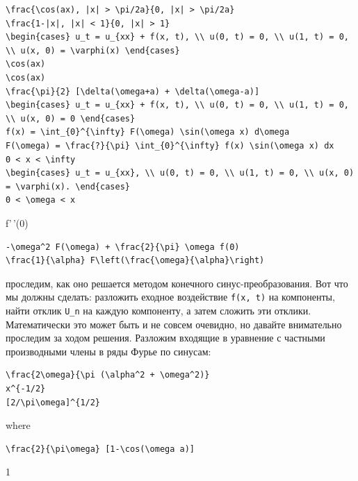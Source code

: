 \documentclass[
  ukrainian,
]{article}
\begin{document}
\begin{verbatim}
\frac{\cos(ax), |x| > \pi/2a}{0, |x| > \pi/2a}
\frac{1-|x|, |x| < 1}{0, |x| > 1}
\begin{cases} u_t = u_{xx} + f(x, t), \\ u(0, t) = 0, \\ u(1, t) = 0, \\ u(x, 0) = \varphi(x) \end{cases}
\cos(ax)
\cos(ax)
\frac{\pi}{2} [\delta(\omega+a) + \delta(\omega-a)]
\begin{cases} u_t = u_{xx} + f(x, t), \\ u(0, t) = 0, \\ u(1, t) = 0, \\ u(x, 0) = 0 \end{cases}
f(x) = \int_{0}^{\infty} F(\omega) \sin(\omega x) d\omega
F(\omega) = \frac{?}{\pi} \int_{0}^{\infty} f(x) \sin(\omega x) dx
0 < x < \infty
\begin{cases} u_t = u_{xx}, \\ u(0, t) = 0, \\ u(1, t) = 0, \\ u(x, 0) = \varphi(x). \end{cases}
0 < \omega < x
\end{verbatim}

f'\,'(0)

\begin{verbatim}
-\omega^2 F(\omega) + \frac{2}{\pi} \omega f(0)
\frac{1}{\alpha} F\left(\frac{\omega}{\alpha}\right)
\end{verbatim}

проследим, как оно решается методом конечного синус-преобразования. Вот
что мы должны сделать: разложить еходное воздействие \texttt{f(x,\ t)}
на компоненты, найти отклик \texttt{U\_n} на каждую компоненту, а затем
сложить эти отклики. Математически это может быть и не совсем очевидно,
но давайте внимательно проследим за ходом решения. Разложим входящие в
уравнение с частными производными члены в ряды Фурье по синусам:

\begin{verbatim}
\frac{2\omega}{\pi (\alpha^2 + \omega^2)}
x^{-1/2}
[2/\pi\omega]^{1/2}
\end{verbatim}

where

\begin{verbatim}
\frac{2}{\pi\omega} [1-\cos(\omega a)]
\end{verbatim}

1
\end{document}
